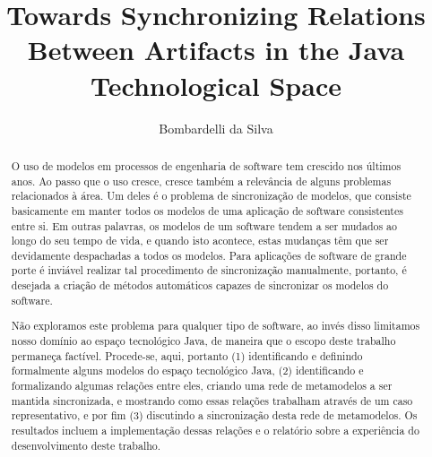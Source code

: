 \documentclass[cic,resumo-unibral]{iiufrgs}
\title{Towards Synchronizing Relations Between Artifacts in the Java Technological Space}
\author{Bombardelli da Silva}{William}
\begin{document}
\maketitle




\begin{abstract}
O uso de modelos em processos de engenharia de software tem crescido nos últimos anos. Ao passo que o uso cresce, cresce também a relevância de alguns problemas relacionados à área. Um deles é o problema de sincronização de modelos, que consiste basicamente em manter todos os modelos de uma aplicação de software consistentes entre si. Em outras palavras, os modelos de um software tendem a ser mudados ao longo do seu tempo de vida, e quando isto acontece, estas mudanças têm que ser devidamente despachadas a todos os modelos. Para aplicações de software de grande porte é inviável realizar tal procedimento de sincronização manualmente, portanto, é desejada a criação de métodos automáticos capazes de sincronizar os modelos do software.

Não exploramos este problema para qualquer tipo de software, ao invés disso limitamos nosso domínio ao espaço tecnológico Java, de maneira que o escopo deste trabalho permaneça factível. Procede-se, aqui, portanto (1) identificando e definindo formalmente alguns modelos do espaço tecnológico Java, (2) identificando e formalizando algumas relações entre eles, criando uma rede de metamodelos a ser mantida sincronizada, e mostrando como essas relações trabalham através de um caso representativo, e por fim (3) discutindo a sincronização desta rede de metamodelos. Os resultados incluem a implementação dessas relações e o relatório sobre a experiência do desenvolvimento deste trabalho.
\end{abstract}
\end{document}
